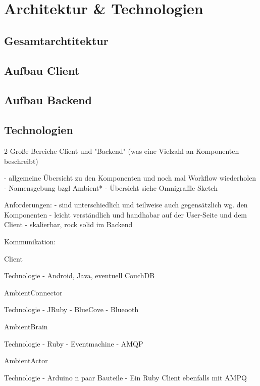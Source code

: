\chapter{Architektur & Technologien}


\section{Gesamtarchtitektur}

\section{Aufbau Client}
\section{Aufbau Backend}


\section{Technologien}
2 Große Bereiche Client und "Backend" (was eine Vielzahl an Komponenten beschreibt)

- allgemeine Übersicht zu den Komponenten und noch mal Workflow wiederholen
- Namensgebung bzgl Ambient*
- Übersicht siehe Omnigraffle Sketch 

Anforderungen:
- sind unterschiedlich und teilweise auch gegensätzlich wg. den Komponenten 
- leicht verständlich und handhabar auf der User-Seite und dem Client 
- skalierbar, rock solid im Backend

Kommunikation:

Client

Technologie
- Android, Java, eventuell CouchDB

AmbientConnector

Technologie
- JRuby 
- BlueCove 
- Blueooth 

AmbientBrain 

Technologie
- Ruby 
- Eventmachine
- AMQP

AmbientActor

Technologie
- Arduino n paar Bauteile 
- Ein Ruby Client ebenfalls mit AMPQ

